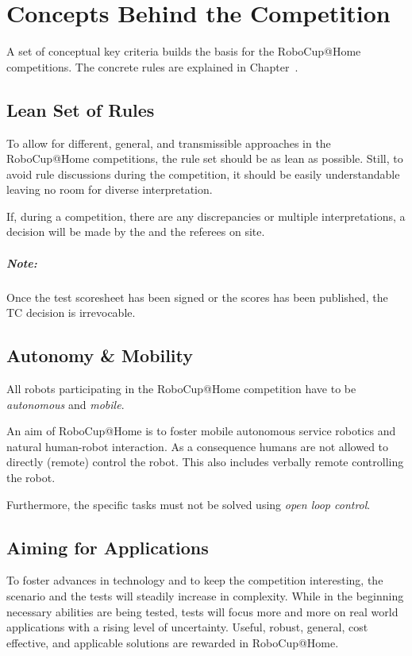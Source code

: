 \chapter{Concepts Behind the Competition}
\label{chap:concepts}
A set of conceptual key criteria builds the basis for the RoboCup@Home competitions. The concrete rules are explained in Chapter~.

\section{Lean Set of Rules}
\label{concept:lean_set_of_rules}
To allow for different, general, and transmissible approaches in the RoboCup@Home competitions, the rule set should be as lean as possible. Still, to avoid rule discussions during the competition, it should be easily understandable leaving no room for diverse interpretation.

If, during a competition, there are any discrepancies or multiple interpretations, a decision will be made by the  and the referees on site.

\paragraph*{Note: } Once the test scoresheet has been signed or the scores has been published, the TC decision is irrevocable.

\section{Autonomy \& Mobility}
\label{concept:autonomy_and_mobility}
All robots participating in the RoboCup@Home competition have to be \emph{autonomous} and \emph{mobile}.

An aim of RoboCup@Home is to foster mobile autonomous service robotics and natural human-robot interaction. As a consequence humans are not allowed to directly (remote) control the robot. This also includes verbally remote controlling the robot.

Furthermore, the specific tasks must not be solved using \emph{open loop control}.

\section{Aiming for Applications}
\label{concept:aiming_for_applications}
To foster advances in technology and to keep the competition interesting, the scenario and the tests will steadily increase in complexity. While in the beginning necessary abilities are being tested, tests will focus more and more on real world applications with a rising level of uncertainty. Useful, robust, general, cost effective, and applicable solutions are rewarded in RoboCup@Home.

